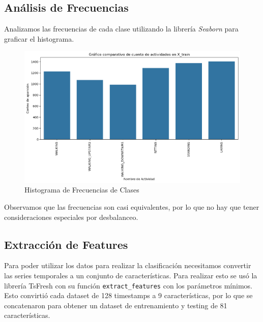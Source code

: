 \documentclass[conference]{IEEEtran}
\begin{document}
\subsection{Análisis de Frecuencias}
Analizamos las frecuencias de cada clase utilizando la librería \textit{Seaborn} para graficar el histograma.
\begin{figure}
    \centering
    \includegraphics[width=\linewidth]{class_freq.png}
    \caption{Histograma de Frecuencias de Clases}
    \label{fig1}
\end{figure}
Observamos que las frecuencias son casi equivalentes, por lo que no hay que tener consideraciones especiales por desbalanceo.

\subsection{Extracción de Features}
Para poder utilizar los datos para realizar la clasificación necesitamos convertir las series temporales a un conjunto de características. Para realizar esto se usó la librería TsFresh con su función \texttt{extract\_features} con los parámetros mínimos. Esto convirtió cada dataset de 128 timestamps a 9 características, por lo que se concatenaron para obtener un dataset de entrenamiento y testing de 81 características.
\end{document}
